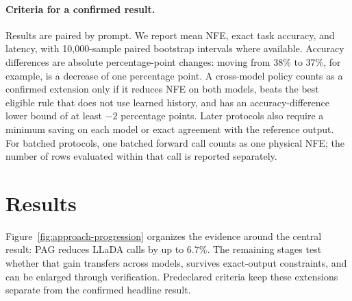 \documentclass{article}
\newcommand{\nfe}{NFE}
\begin{document}
\paragraph{Criteria for a confirmed result.}
Results are paired by prompt. We report mean \nfe{}, exact task accuracy, and latency, with 10{,}000-sample paired bootstrap intervals where available. Accuracy differences are absolute percentage-point changes: moving from 38\% to 37\%, for example, is a decrease of one percentage point. A cross-model policy counts as a confirmed extension only if it reduces \nfe{} on both models, beats the best eligible rule that does not use learned history, and has an accuracy-difference lower bound of at least $-2$ percentage points. Later protocols also require a minimum saving on each model or exact agreement with the reference output. For batched protocols, one batched forward call counts as one physical \nfe{}; the number of rows evaluated within that call is reported separately.

\section{Results}
\label{sec:results}

Figure~\ref{fig:approach-progression} organizes the evidence around the central result: PAG reduces LLaDA calls by up to 6.7\%. The remaining stages test whether that gain transfers across models, survives exact-output constraints, and can be enlarged through verification. Predeclared criteria keep these extensions separate from the confirmed headline result.
\end{document}
